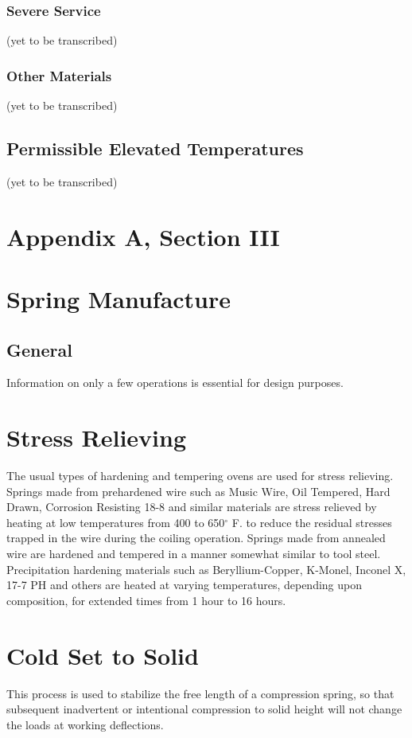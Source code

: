 \documentclass[10pt]{article}
\begin{document}
\subsubsection{Severe Service}
(yet to be transcribed)

\subsubsection{Other Materials}
(yet to be transcribed)

\subsection{Permissible Elevated Temperatures}
(yet to be transcribed)


\clearpage
\setcounter{section}{29} %
\section*{Appendix A, Section III}
\section{Spring Manufacture} %
\subsection{General} %
Information on only a few operations is essential for design purposes.

\section{Stress Relieving} %
The usual types of hardening and tempering ovens are used for stress relieving. 
Springs made from prehardened wire such as Music Wire, Oil Tempered, Hard Drawn, Corrosion Resisting 18-8 and similar materials are stress relieved by heating at low temperatures from 400 to 650$^{\circ}$ F. to reduce the residual stresses trapped in the wire during the coiling operation.
Springs made from annealed wire are hardened and tempered in a manner somewhat similar to tool steel. 
Precipitation hardening materials such as Beryllium-Copper, K-Monel, Inconel X, 17-7 PH and others are heated at varying temperatures, depending upon composition, for extended times from 1 hour to 16 hours.

\section{Cold Set to Solid} %
This process is used to stabilize the free length of a compression spring, so that subsequent inadvertent or intentional compression to solid height will not change the loads at working deflections.
\end{document}

